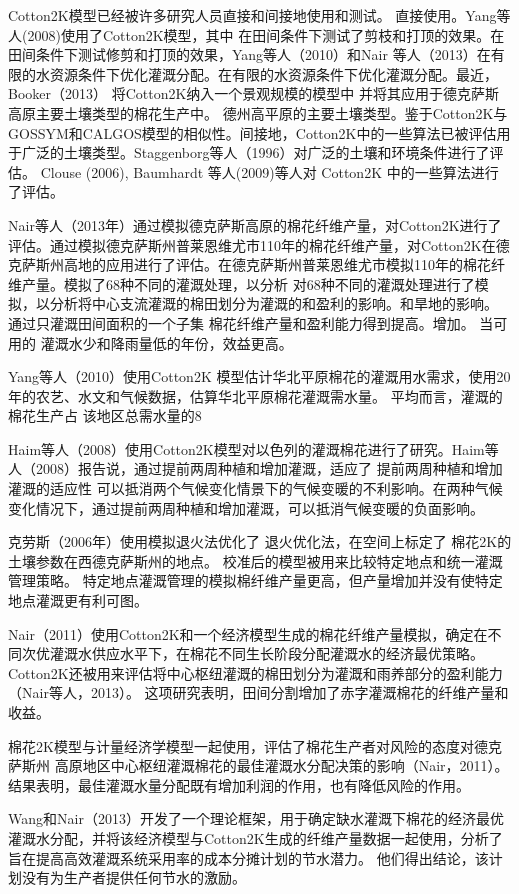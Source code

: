 Cotton2K模型已经被许多研究人员直接和间接地使用和测试。
直接使用。Yang等人(2008)使用了Cotton2K模型，其中
在田间条件下测试了剪枝和打顶的效果。在田间条件下测试修剪和打顶的效果，Yang等人（2010）和Nair 等人（2013）在有限的水资源条件下优化灌溉分配。在有限的水资源条件下优化灌溉分配。最近，Booker（2013） 将Cotton2K纳入一个景观规模的模型中 并将其应用于德克萨斯高原主要土壤类型的棉花生产中。
德州高平原的主要土壤类型。鉴于Cotton2K与GOSSYM和CALGOS模型的相似性。间接地，Cotton2K中的一些算法已被评估用于广泛的土壤类型。Staggenborg等人（1996）对广泛的土壤和环境条件进行了评估。
Clouse (2006), Baumhardt 等人(2009)等人对 Cotton2K 中的一些算法进行了评估。

Nair等人（2013年）通过模拟德克萨斯高原的棉花纤维产量，对Cotton2K进行了评估。通过模拟德克萨斯州普莱恩维尤市110年的棉花纤维产量，对Cotton2K在德克萨斯州高地的应用进行了评估。在德克萨斯州普莱恩维尤市模拟110年的棉花纤维产量。模拟了68种不同的灌溉处理，以分析 对68种不同的灌溉处理进行了模拟，以分析将中心支流灌溉的棉田划分为灌溉的和盈利的影响。和旱地的影响。
通过只灌溉田间面积的一个子集 棉花纤维产量和盈利能力得到提高。增加。
当可用的 灌溉水少和降雨量低的年份，效益更高。

Yang等人（2010）使用Cotton2K 模型估计华北平原棉花的灌溉用水需求，使用20 年的农艺、水文和气候数据，估算华北平原棉花灌溉需水量。
平均而言，灌溉的棉花生产占 该地区总需水量的8%

Haim等人（2008）使用Cotton2K模型对以色列的灌溉棉花进行了研究。Haim等人（2008）报告说，通过提前两周种植和增加灌溉，适应了 提前两周种植和增加灌溉的适应性 可以抵消两个气候变化情景下的气候变暖的不利影响。在两种气候变化情况下，通过提前两周种植和增加灌溉，可以抵消气候变暖的负面影响。

克劳斯（2006年）使用模拟退火法优化了 退火优化法，在空间上标定了 棉花2K的土壤参数在西德克萨斯州的地点。
校准后的模型被用来比较特定地点和统一灌溉管理策略。
特定地点灌溉管理的模拟棉纤维产量更高，但产量增加并没有使特定地点灌溉更有利可图。

Nair（2011）使用Cotton2K和一个经济模型生成的棉花纤维产量模拟，确定在不同次优灌溉水供应水平下，在棉花不同生长阶段分配灌溉水的经济最优策略。Cotton2K还被用来评估将中心枢纽灌溉的棉田划分为灌溉和雨养部分的盈利能力（Nair等人，2013）。
这项研究表明，田间分割增加了赤字灌溉棉花的纤维产量和收益。

棉花2K模型与计量经济学模型一起使用，评估了棉花生产者对风险的态度对德克萨斯州 高原地区中心枢纽灌溉棉花的最佳灌溉水分配决策的影响（Nair，2011）。
结果表明，最佳灌溉水量分配既有增加利润的作用，也有降低风险的作用。

Wang和Nair（2013）开发了一个理论框架，用于确定缺水灌溉下棉花的经济最优灌溉水分配，并将该经济模型与Cotton2K生成的纤维产量数据一起使用，分析了旨在提高高效灌溉系统采用率的成本分摊计划的节水潜力。
他们得出结论，该计划没有为生产者提供任何节水的激励。

